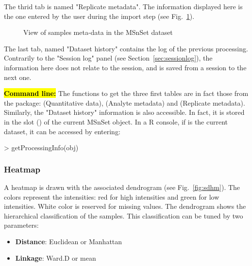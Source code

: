 \documentclass[12pt]{article}
\begin{document}
The thrid tab is named "Replicate metadata". The information displayed here 
is the one entered by the user during the import step 
(see Fig.~\ref{fig:sdqv3}).

\begin {figure}
\centering
{}
\caption{View of samples meta-data in the MSnSet dataset}\label{fig:sdqv3}
\end {figure}

The last tab, named "Dataset history" contains the log of the previous 
processing. Contrarily to the "Session log" panel (see 
Section~\ref{sec:sessionlog}), the information here does not relate to the 
session, and is saved from a session to the next one.

\hl{\bf Command line:}  The  functions to get the three first 
tables are in fact those from the  package: 
 (Quantitative data),  
(Analyte metadata) and  (Replicate metadata). 
Similarly, the "Dataset history" information is also accessible. In fact, 
it is stored in the slot () of the current MSnSet 
object. In a R console, if  is the current dataset, it can be 
accessed by entering:
\begin{Schunk}
\begin{Sinput}
> getProcessingInfo(obj)
\end{Sinput}
\end{Schunk}

\subsubsection {Heatmap}
A heatmap is drawn with the associated dendrogram (see Fig.~\ref{fig:sdhm}). 
The colors represent the intensities: red for high intensities and green for 
low intensities. White color is reserved for missing values.
The dendrogram shows the hierarchical classification of the samples. This 
classification can be tuned by two parameters:
\begin {itemize}
\item \textbf{Distance}: Euclidean or Manhattan
\item \textbf{Linkage}: Ward.D or mean
\end {itemize}
\end{document}
